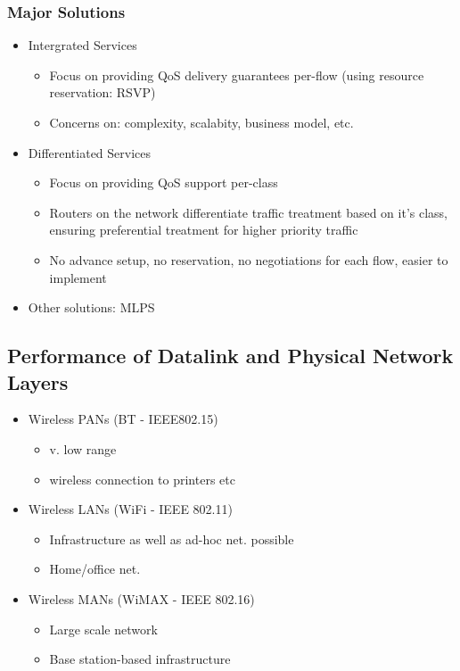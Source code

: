 \subsubsection{Major Solutions}
\begin{itemize}
	\item Intergrated Services
	\begin{itemize}
		\item Focus on providing QoS delivery guarantees per-flow (using
			resource reservation: RSVP)
		\item Concerns on: complexity, scalabity, business model, etc.
	\end{itemize}
	\item Differentiated Services
	\begin{itemize}
		\item Focus on providing QoS support per-class
		\item Routers on the network differentiate traffic treatment
			based on it's class, ensuring preferential treatment for
			higher priority traffic
		\item No advance setup, no reservation, no negotiations for each
			flow, easier to implement
	\end{itemize}
	\item Other solutions: MLPS
\end{itemize}
\subsection{Performance of Datalink and Physical Network Layers}
\begin{itemize}
	\item Wireless PANs (BT - IEEE802.15)
	\begin{itemize}
		\item v. low range
		\item wireless connection to printers etc
	\end{itemize}
	\item Wireless LANs (WiFi - IEEE 802.11)
	\begin{itemize}
		\item Infrastructure as well as ad-hoc net. possible
		\item Home/office net.
	\end{itemize}
	\item Wireless MANs (WiMAX - IEEE 802.16)
	\begin{itemize}
		\item Large scale network
		\item Base station-based infrastructure
	\end{itemize}
\end{itemize}
